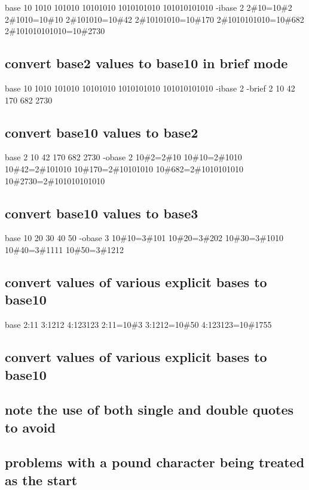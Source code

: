 base 10 1010 101010 10101010 1010101010 101010101010 -\/ibase 2 2\#10=10\#2 2\#1010=10\#10 2\#101010=10\#42 2\#10101010=10\#170 2\#1010101010=10\#682 2\#101010101010=10\#2730

\subsection*{convert base2 values to base10 in brief mode}

base 10 1010 101010 10101010 1010101010 101010101010 -\/ibase 2 -\/brief 2 10 42 170 682 2730

\subsection*{convert base10 values to base2}

base 2 10 42 170 682 2730 -\/obase 2 10\#2=2\#10 10\#10=2\#1010 10\#42=2\#101010 10\#170=2\#10101010 10\#682=2\#1010101010 10\#2730=2\#101010101010

\subsection*{convert base10 values to base3}

base 10 20 30 40 50 -\/obase 3 10\#10=3\#101 10\#20=3\#202 10\#30=3\#1010 10\#40=3\#1111 10\#50=3\#1212

\subsection*{convert values of various explicit bases to base10}

base 2\+:11 3\+:1212 4\+:123123 2\+:11=10\#3 3\+:1212=10\#50 4\+:123123=10\#1755

\subsection*{convert values of various explicit bases to base10}

\subsection*{note the use of both single and double quotes to avoid}

\subsection*{problems with a pound character being treated as the start}

